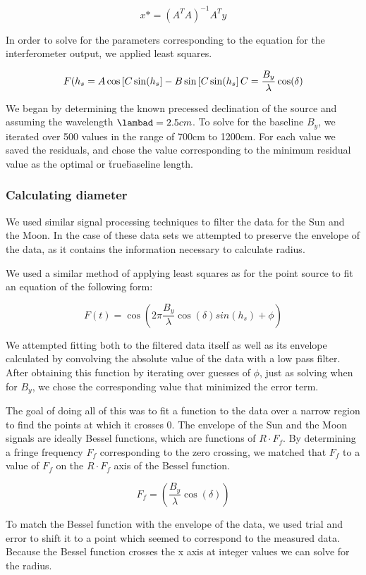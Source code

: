 \documentclass{article}
\begin{document}
  \[x* = (A^{T}A)^{-1}A^{T}y \]

  In order to solve for the parameters corresponding to the equation for the
  interferometer output, we applied least squares.

  \[F(h_{s} = A\cos \left [C\sin(h_{s}\right] - B\sin \left
  [C\sin(h_{s}\right]\\
  C = \frac{B_{y}}{\lambda}\cos(\delta)
  \]

  We began by determining the known precessed declination of the source and
  assuming the wavelength $\lambad = 2.5cm$. To solve for the baseline $B_{y}$,
  we iterated over 500 values in the range of 700cm to 1200cm. For each value we
  saved the residuals, and chose the value corresponding to the minimum residual
  value as the optimal or \"true\" baseline length.

  \subsubsection{Calculating diameter}
  We used similar signal processing techniques to filter the data for the Sun
  and the Moon. In the case of these data sets we attempted to preserve the
  envelope of the data, as it contains the information necessary to calculate
  radius.

  We used a similar method of applying least squares as for the point source to
  fit an equation of the following form:

  \[F(t) = \cos \left (2\pi \frac{B_{y}}{\lambda} \cos(\delta)
      sin(h_{s}) + \phi \right)\]

  We attempted fitting both to the filtered data itself as well as its envelope
  calculated by convolving the absolute value of the data with a low pass filter.
  After obtaining this function by iterating over guesses of $\phi$, just as
  solving when for $B_{y}$, we chose the corresponding value that minimized the
  error term.

  The goal of doing all of this was to fit a function to the data over a narrow
  region to find the points at which it crosses 0. The envelope of the Sun and
  the Moon signals are ideally Bessel functions, which are functions of  $R \cdot
  F_{f}$. By determining a fringe frequency $F_{f}$ corresponding to the zero
  crossing, we matched that $F_{f}$ to a value of $F_{f}$ on the $R \cdot
  F_{f}$ axis of the Bessel function.

  \[F_{f} = \left (\frac{B_{y}}{\lambda}\cos(\delta)\right ) \]

  To match the Bessel function with the envelope of the data, we used trial and
  error to shift it to a point which seemed to correspond to the measured data.
  Because the Bessel function crosses the x axis at integer values we can solve
  for the radius.
\end{document}

